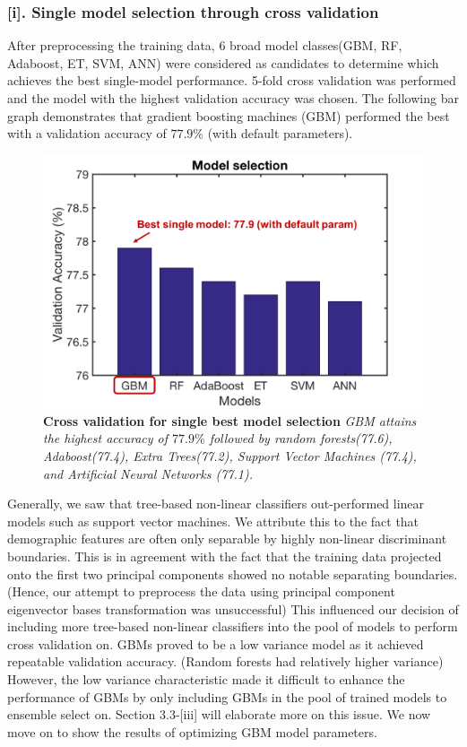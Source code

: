 \subsubsection*{[i]. Single model selection through cross validation}
After preprocessing the training data, 6 broad model classes(GBM, RF, Adaboost, ET, SVM, ANN) were considered as candidates to determine which achieves the best single-model performance. 5-fold cross validation was performed and the model with the highest validation accuracy was chosen. The following bar graph demonstrates that gradient boosting machines (GBM) performed the best with a validation accuracy of $77.9\%$ (with default parameters). 
\begin{figure}[h]
\center
\includegraphics[scale=0.45]{figure2/figure2.png}
\caption{\textbf{Cross validation for single best model selection} \textit{GBM attains the highest accuracy of $77.9\%$ followed by random forests(77.6), Adaboost(77.4), Extra Trees(77.2), Support Vector Machines (77.4), and Artificial Neural Networks (77.1).}}
\end{figure}

Generally, we saw that tree-based non-linear classifiers out-performed linear models such as support vector machines. We attribute this to the fact that demographic features are often only separable by highly non-linear discriminant boundaries. This is in agreement with the fact that the training data projected onto the first two principal components showed no notable separating boundaries. (Hence, our attempt to preprocess the data using principal component eigenvector bases transformation was unsuccessful) This influenced our decision of including more tree-based non-linear classifiers into the pool of models to perform cross validation on. GBMs proved to be a low variance model as it achieved repeatable validation accuracy. (Random forests had relatively higher variance) However, the low variance characteristic made it difficult to enhance the performance of GBMs by only including GBMs in the pool of trained models to ensemble select on. Section 3.3-[iii] will elaborate more on this issue. We now move on to show the results of optimizing GBM model parameters. 

